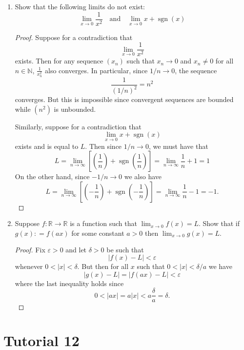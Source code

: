 \documentclass[12pt, reqno]{article}
\numberwithin{equation}{section}
\theoremstyle{definition}
\theoremstyle{remark}
\newcommand{\NN}{\mathbb{N}}
\newcommand{\RR}{\mathbb{R}}
\newcommand{\abs}[1]{\left\lvert#1\right\rvert}
\renewcommand{\epsilon}{\varepsilon}
\begin{document}
\begin{enumerate}[leftmargin=*]
	\item Show that the following limits do not exist:
	      \[
		      \lim_{x\to 0} \frac{1}{x^2}
		      \quad\text{and}\quad
		      \lim_{x\to 0} x+\operatorname{sgn}(x)
	      \]
	      \begin{proof}
		      Suppose for a contradiction that
		      \[
			      \lim_{x\to 0} \frac{1}{x^2}
		      \]
		      exists. Then for any sequence $(x_n)$ such that $x_n \to 0$ and $x_n\neq 0$ for all $n\in \NN$, $\frac{1}{x_n^2}$ also converges. In particular, since $1/n \to 0$, the sequence
		      \[
			      \frac{1}{(1/n)^2} = n^2
		      \]
		      converges. But this is impossible since convergent sequences are bounded while $(n^2)$ is unbounded.

		      Similarly, suppose for a contradiction that
		      \[
			      \lim_{x\to 0} x+\operatorname{sgn}(x)
		      \]
		      exists and is equal to $L$. Then since $1/n \to 0$, we must have that
		      \[
			      L = \lim_{n\to\infty}\left[\left(\frac{1}{n}\right) + \operatorname{sgn}\left(\frac{1}{n}\right)\right]
			      = \lim_{n\to\infty} \frac{1}{n} + 1 = 1
		      \]
		      On the other hand, since $-1/n \to 0$ we also have
		      \[
			      L = \lim_{n\to\infty}\left[\left(-\frac{1}{n}\right) + \operatorname{sgn}\left(-\frac{1}{n}\right)\right]
			      = \lim_{n\to\infty} \frac{1}{n} - 1 = -1.
		      \]
	      \end{proof}

	\item Suppose $f:\RR\to\RR$ is a function such that $\lim_{x\to 0} f(x) = L$. Show that if $g(x): = f(ax)$ for some constant $a>0$ then $\lim_{x\to 0} g(x) = L$.

	      \begin{proof}
		      Fix $\epsilon>0$ and let $\delta>0$ be such that
		      \[
			      \abs{f(x) - L} < \epsilon
		      \]
		      whenever $0<\abs{x} < \delta$. But then for all $x$ such that $0 < \abs{x} < \delta/a$ we have
		      \[
			      \abs{g(x) - L} = \abs{f(ax) - L} < \epsilon
		      \]
		      where the last inequality holds since
		      \[
			      0 < \abs{ax} = a\abs{x} < a\frac{\delta}{a} = \delta.
		      \]
	      \end{proof}

\end{enumerate}

\section*{Tutorial 12}
\end{document}
